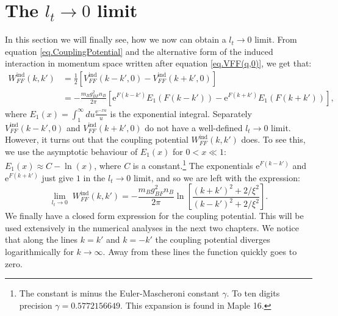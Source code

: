\section{The $l_t \to 0$ limit}
In this section we will finally see, how we now can obtain a $l_t\to 0$ limit. From equation \eqref{eq.CouplingPotential} and the alternative form of the induced interaction in momentum space written after equation \eqref{eq.VFF(q,0)}, we get that:
\begin{align}
W^\text{ind}_{FF}(k,k') &= \frac{1}{2}\left[V^\text{ind}_{FF}(k-k',0) - V^\text{ind}_{FF}(k+k',0)\right] \nonumber \\
&= -\frac{m_Bg_{BF}^2n_B}{2\pi}\left[ \text{e}^{F(k-k')} E_1(F(k-k')) - \text{e}^{F(k+k')} E_1(F(k+k')) \right], \nonumber
\end{align}
where $E_1(x) = \int_1^\infty du \frac{\text{e}^{-xu}}{u}$ is the exponential integral. Separately $V^\text{ind}_{FF}(k-k',0)$ and $V^\text{ind}_{FF}(k+k',0)$ do not have a well-defined $l_t \to 0$ limit. However, it turns out that the coupling potential $W^\text{ind}_{FF}(k,k')$ does. To see this, we use the asymptotic behaviour of $E_1(x)$ for $0 < x \ll 1$: $E_1(x) \approx C -\ln(x)$, where $C$ is a constant.\footnote{The constant is minus the Euler-Mascheroni constant $\gamma$. To ten digits precision $\gamma = 0.5772156649$. This expansion is found in Maple 16.} The exponentials $\text{e}^{F(k-k')}$ and $\text{e}^{F(k+k')}$ just give $1$ in the $l_t \to 0$ limit, and so we are left with the expression:
\begin{equation}
\lim_{l_t \to 0} \; W^\text{ind}_{FF}(k,k') = -\frac{m_Bg_{BF}^2n_B}{2\pi} \ln\left[\frac{(k+k')^2+2/\xi^2}{(k-k')^2+2/\xi^2}\right].
\label{eq.CouplingPotentiallt=0} 
\end{equation}
We finally have a closed form expression for the coupling potential. This will be used extensively in the numerical analyses in the next two chapters. We notice that along the lines $k = k'$ and $k = -k'$ the coupling potential diverges logarithmically for $k\to \infty$. Away from these lines the function quickly goes to zero.



